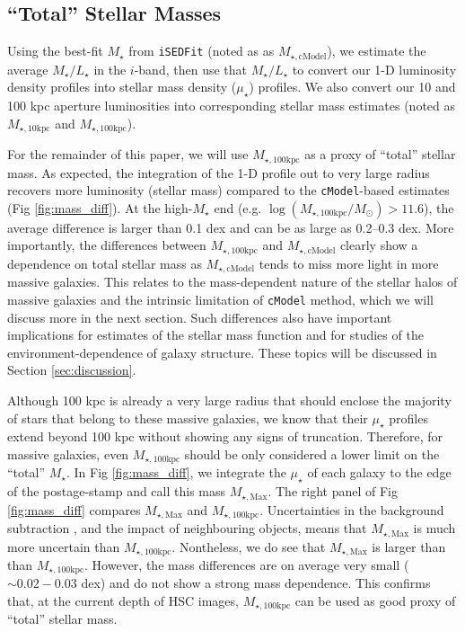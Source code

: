 \documentclass[a4paper,fleqn,usenatbib]{mnras}
\def\cmodel{\texttt{cModel}}
\def\mstar{{$M_{\star}$}}
\def\minn{{$M_{\star,10\mathrm{kpc}}$}}
\def\mtot{{$M_{\star,100\mathrm{kpc}}$}}
\def\mmax{{$M_{\star,\mathrm{Max}}$}}
\def\mcmodel{{$M_{\star,\mathrm{cModel}}$}}
\def\logmtot{{$\log (M_{\star,100\mathrm{kpc}}/M_{\odot})$}}
\def\m2l{{$M_{\star}/L_{\star}$}}
\def\mden{{$\mu_{\star}$}}
\begin{document}

\subsection{``Total'' Stellar Masses}
    \label{ssec:mtotal}
    
    Using the best-fit \mstar{} from \texttt{iSEDFit} (noted as as \mcmodel{}), 
    we estimate the average \m2l{} in the $i$-band, then use that \m2l{} to convert 
    our 1-D luminosity density profiles into stellar mass density (\mden{}) profiles. 
    We also convert our 10 and 100 kpc aperture luminosities into corresponding stellar 
    mass estimates (noted as \minn{} and \mtot{}).

    For the remainder of this paper, we will use \mtot{} as a proxy of ``total'' 
    stellar mass. 
    As expected, the integration of the 1-D profile out to very large radius recovers 
    more luminosity (stellar mass) compared to the \cmodel{}-based estimates 
    (Fig \ref{fig:mass_diff}).
    At the high-\mstar{} end (e.g. \logmtot{}$>11.6$), the average difference is larger 
    than 0.1 dex and can be as large as 0.2--0.3 dex.  
    More importantly, the differences between \mtot{} and \mcmodel{} clearly show a 
    dependence on total stellar mass as \mcmodel{} tends to miss more light in 
    more massive galaxies.  
    This relates to the mass-dependent nature of the stellar halos of massive 
    galaxies and the intrinsic limitation of \cmodel{} method, which we will discuss
    more in the next section.
    Such differences also have important implications for estimates of the stellar 
    mass function and for studies of the environment-dependence of galaxy structure. These topics will be discussed in Section \ref{sec:discussion}.
    
    Although 100 kpc is already a very large radius that should enclose the majority 
    of stars that belong to these massive galaxies, we know that their \mden{} 
    profiles extend beyond 100 kpc without showing any signs of truncation. 
    Therefore, for massive galaxies, even \mtot{} should be only considered a lower
    limit on the ``total'' \mstar{}. 
    In Fig \ref{fig:mass_diff}, we integrate the \mden{} of each galaxy to the  edge of the postage-stamp and call this mass \mmax{}. The right panel of Fig \ref{fig:mass_diff} compares \mmax{} and \mtot{}.  Uncertainties in the background subtraction , and the impact of neighbouring objects, means that \mmax{} is much more uncertain than \mtot{}. Nontheless, we do see that \mmax{} is larger than than \mtot{}. However, the mass differences are on average very small ($\sim0.02-0.03$ dex) and 
    do not show a strong mass dependence.  
    This confirms that, at the current depth of HSC images, \mtot{} can be used as 
    good proxy of ``total'' stellar mass.   
    
\end{document}
